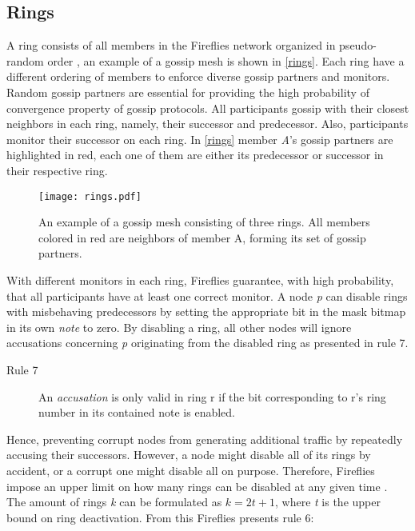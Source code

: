 \documentclass[USenglish]{uit-thesis}
\begin{document}
\subsection{Rings}
A ring consists of all members in the Fireflies network organized in pseudo-random order \cite{flies}, an example of a gossip mesh is shown in \autoref{rings}.
Each ring have a different ordering of members to enforce diverse gossip partners and monitors.
Random gossip partners are essential for providing the high probability of convergence property of gossip protocols.
All participants gossip with their closest neighbors in each ring, namely, their successor and predecessor.
Also, participants monitor their successor on each ring.
In \autoref{rings} member \textit{A}'s gossip partners are highlighted in red, each one of them are either its predecessor or successor in their respective ring.

\begin{figure}[h]
	\centering
	\texttt{[image: rings.pdf]}
	\caption{An example of a gossip mesh consisting of three rings. All members colored in red are neighbors of member A, forming its set of gossip partners.}
	\label{rings}
\end{figure}

With different monitors in each ring, Fireflies guarantee, with high probability, that all participants have at least one correct monitor.
A node \textit{p} can disable rings with misbehaving predecessors by setting the appropriate bit in the mask bitmap in its own \textit{note} to zero.
By disabling a ring, all other nodes will ignore accusations concerning \textit{p} originating from the disabled ring as presented in rule 7.
\begin{description}
\item[Rule 7] An \textit{accusation} is only valid in ring r if the bit corresponding to r's ring number in its contained note is enabled. 
\end{description}

Hence, preventing corrupt nodes from generating additional traffic by repeatedly accusing their successors.
However, a node might disable all of its rings by accident, or a corrupt one might disable all on purpose.
Therefore, Fireflies impose an upper limit on how many rings can be disabled at any given time \cite{flies}.
The amount of rings \textit{k} can be formulated as $k = 2t + 1$, where \textit{t} is the upper bound on ring deactivation.
From this Fireflies presents rule 6:
\end{document}

